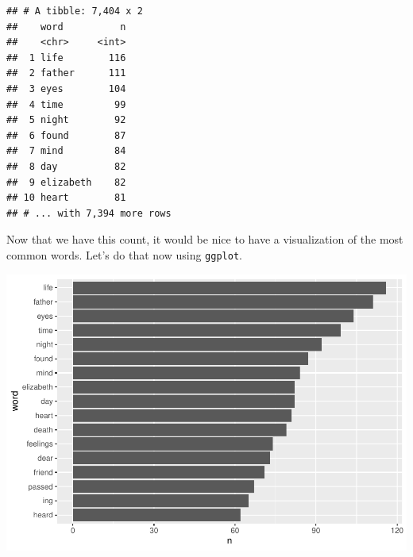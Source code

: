 \documentclass[]{article}
\newenvironment{Shaded}{\begin{snugshade}}{\end{snugshade}}
\newcommand{\DataTypeTok}[1]{\textcolor[rgb]{0.13,0.29,0.53}{#1}}
\newcommand{\DecValTok}[1]{\textcolor[rgb]{0.00,0.00,0.81}{#1}}
\newcommand{\KeywordTok}[1]{\textcolor[rgb]{0.13,0.29,0.53}{\textbf{#1}}}
\newcommand{\NormalTok}[1]{#1}
\newcommand{\OperatorTok}[1]{\textcolor[rgb]{0.81,0.36,0.00}{\textbf{#1}}}
\newcommand{\StringTok}[1]{\textcolor[rgb]{0.31,0.60,0.02}{#1}}
\begin{document}
\begin{verbatim}
## # A tibble: 7,404 x 2
##    word          n
##    <chr>     <int>
##  1 life        116
##  2 father      111
##  3 eyes        104
##  4 time         99
##  5 night        92
##  6 found        87
##  7 mind         84
##  8 day          82
##  9 elizabeth    82
## 10 heart        81
## # ... with 7,394 more rows
\end{verbatim}

Now that we have this count, it would be nice to have a visualization of
the most common words. Let's do that now using \texttt{ggplot}.

\begin{Shaded}
\end{Shaded}

\includegraphics{2020-08-05-processing-text-data_files/figure-latex/unnamed-chunk-13-1.pdf}
\end{document}
